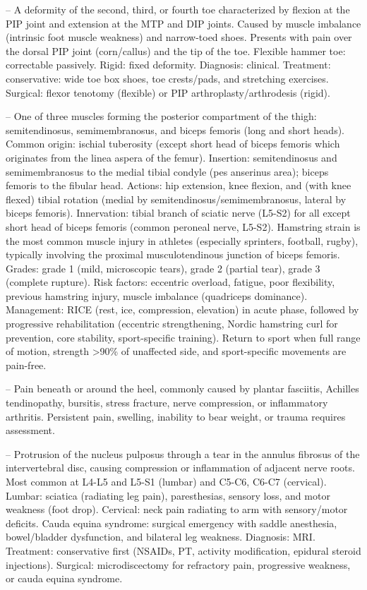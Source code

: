 -- A deformity of the second, third, or fourth toe characterized by flexion at the PIP joint and extension at the MTP and DIP joints. Caused by muscle imbalance (intrinsic foot muscle weakness) and narrow-toed shoes. Presents with pain over the dorsal PIP joint (corn/callus) and the tip of the toe. Flexible hammer toe: correctable passively. Rigid: fixed deformity. Diagnosis: clinical. Treatment: conservative: wide toe box shoes, toe crests/pads, and stretching exercises. Surgical: flexor tenotomy (flexible) or PIP arthroplasty/arthrodesis (rigid).

-- One of three muscles forming the posterior compartment of the thigh: semitendinosus, semimembranosus, and biceps femoris (long and short heads). Common origin: ischial tuberosity (except short head of biceps femoris which originates from the linea aspera of the femur). Insertion: semitendinosus and semimembranosus to the medial tibial condyle (pes anserinus area); biceps femoris to the fibular head. Actions: hip extension, knee flexion, and (with knee flexed) tibial rotation (medial by semitendinosus/semimembranosus, lateral by biceps femoris). Innervation: tibial branch of sciatic nerve (L5-S2) for all except short head of biceps femoris (common peroneal nerve, L5-S2). Hamstring strain is the most common muscle injury in athletes (especially sprinters, football, rugby), typically involving the proximal musculotendinous junction of biceps femoris. Grades: grade 1 (mild, microscopic tears), grade 2 (partial tear), grade 3 (complete rupture). Risk factors: eccentric overload, fatigue, poor flexibility, previous hamstring injury, muscle imbalance (quadriceps dominance). Management: RICE (rest, ice, compression, elevation) in acute phase, followed by progressive rehabilitation (eccentric strengthening, Nordic hamstring curl for prevention, core stability, sport-specific training). Return to sport when full range of motion, strength >90\% of unaffected side, and sport-specific movements are pain-free.

-- Pain beneath or around the heel, commonly caused by plantar fasciitis, Achilles tendinopathy, bursitis, stress fracture, nerve compression, or inflammatory arthritis. Persistent pain, swelling, inability to bear weight, or trauma requires assessment.

-- Protrusion of the nucleus pulposus through a tear in the annulus fibrosus of the intervertebral disc, causing compression or inflammation of adjacent nerve roots. Most common at L4-L5 and L5-S1 (lumbar) and C5-C6, C6-C7 (cervical). Lumbar: sciatica (radiating leg pain), paresthesias, sensory loss, and motor weakness (foot drop). Cervical: neck pain radiating to arm with sensory/motor deficits. Cauda equina syndrome: surgical emergency with saddle anesthesia, bowel/bladder dysfunction, and bilateral leg weakness. Diagnosis: MRI. Treatment: conservative first (NSAIDs, PT, activity modification, epidural steroid injections). Surgical: microdiscectomy for refractory pain, progressive weakness, or cauda equina syndrome.

